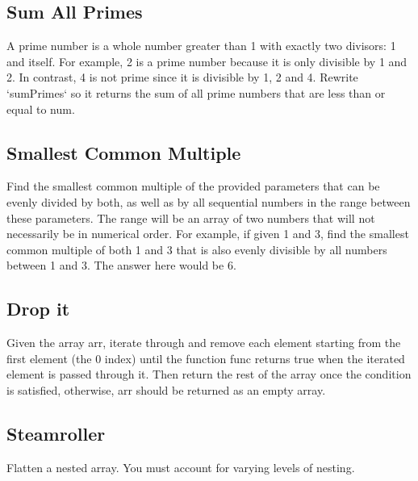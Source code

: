 \documentclass{article}%
\begin{document}
%
\subsection{Sum All Primes}%
\label{subsec:SumAllPrimes}%
A prime number is a whole number greater than 1 with exactly two divisors: 1 and\newline%
itself. For example, 2 is a prime number because it is only divisible by 1 and 2. In\newline%
contrast, 4 is not prime since it is divisible by 1, 2 and 4.\newline%
Rewrite `sumPrimes` so it returns the sum of all prime numbers that are less than or\newline%
equal to num.\newline%

%
\subsection{Smallest Common Multiple}%
\label{subsec:SmallestCommonMultiple}%
Find the smallest common multiple of the provided parameters that can be evenly divided by both, as well as by all sequential numbers in the range between these parameters.\newline%
The range will be an array of two numbers that will not necessarily be in numerical order.\newline%
For example, if given 1 and 3, find the smallest common multiple of both 1 and 3 that is also evenly divisible by all numbers between 1 and 3. The answer here would be 6.\newline%

%
\subsection{Drop it}%
\label{subsec:Dropit}%
Given the array arr, iterate through and remove each element starting from the first element (the 0 index) until the function func returns true when the iterated element is passed through it.\newline%
Then return the rest of the array once the condition is satisfied, otherwise, arr should be returned as an empty array.\newline%

%
\subsection{Steamroller}%
\label{subsec:Steamroller}%
Flatten a nested array. You must account for varying levels of nesting.\newline%
\end{document}
